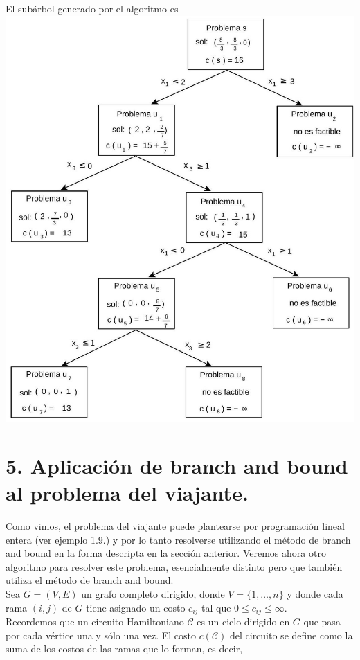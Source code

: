 \documentclass[10pt]{article}
\begin{document}
El subárbol generado por el algoritmo es\\
\includegraphics[max width=\textwidth, center]{2025_09_05_458e5b1ce89abceb5d44g-22}

\section*{5. Aplicación de branch and bound al problema del viajante.}
Como vimos, el problema del viajante puede plantearse por programación lineal entera (ver ejemplo 1.9.) y por lo tanto resolverse utilizando el método de branch and bound en la forma descripta en la sección anterior. Veremos ahora otro algoritmo para resolver este problema, esencialmente distinto pero que también utiliza el método de branch and bound.\\
Sea $G=(V, E)$ un grafo completo dirigido, donde $V=\{1, \ldots, n\}$ y donde cada rama $(i, j)$ de $G$ tiene asignado un costo $c_{i j}$ tal que $0 \leq c_{i j} \leq \infty$.\\
Recordemos que un circuito Hamiltoniano $\mathcal{C}$ es un ciclo dirigido en $G$ que pasa por cada vértice una y sólo una vez. El costo $c(\mathcal{C})$ del circuito se define como la suma de los costos de las ramas que lo forman, es decir,
\end{document}
